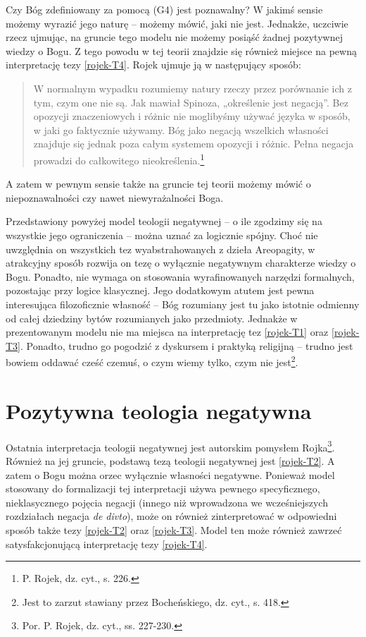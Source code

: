 Czy Bóg zdefiniowany za pomocą (G4) jest poznawalny? W jakimś sensie
możemy wyrazić jego naturę -- możemy mówić, jaki nie jest. Jednakże,
uczciwie rzecz ujmując, na gruncie tego modelu  nie możemy posiąść
żadnej pozytywnej wiedzy o Bogu. Z tego powodu w tej teorii znajdzie
się również miejsce na pewną interpretację tezy \eqref{rojek-T4}. Rojek ujmuje ją w
następujący sposób:



\begin{quote}
    W normalnym wypadku rozumiemy natury rzeczy przez porównanie ich z tym,
czym one nie są. Jak mawiał Spinoza, „określenie jest negacją”. Bez
opozycji znaczeniowych i różnic nie moglibyśmy używać języka w sposób,
w jaki go faktycznie używamy. Bóg jako negacją wszelkich własności
znajduje się jednak poza całym systemem opozycji i różnic. Pełna
negacja prowadzi do całkowitego nieokreślenia.\footnote{P. Rojek, dz.
cyt., s. 226. }
\end{quote}




A zatem w pewnym sensie także na gruncie tej teorii możemy mówić o
niepoznawalności czy nawet niewyrażalności Boga.

Przedstawiony powyżej model teologii negatywnej -- o ile zgodzimy się na
wszystkie jego ograniczenia -- można uznać za logicznie spójny. Choć nie
uwzględnia on wszystkich tez wyabstrahowanych z dzieła Areopagity, w
atrakcyjny sposób rozwija on tezę o wyłącznie negatywnym charakterze
wiedzy o Bogu. Ponadto, nie wymaga on stosowania wyrafinowanych
narzędzi formalnych, pozostając przy logice klasycznej. Jego dodatkowym
atutem jest pewna interesująca filozoficznie własność -- Bóg rozumiany
jest tu jako istotnie odmienny od całej dziedziny bytów rozumianych
jako przedmioty. Jednakże w prezentowanym modelu nie ma miejsca na
interpretację tez \eqref{rojek-T1} oraz \eqref{rojek-T3}. Ponadto, trudno go pogodzić z
dyskursem i praktyką religijną -- trudno jest bowiem oddawać cześć
czemuś, o czym wiemy tylko, czym nie jest\footnote{Jest to zarzut
stawiany przez Bocheńskiego, dz. cyt., s. 418. }.



\section{Pozytywna teologia negatywna}

Ostatnia interpretacja teologii negatywnej jest autorskim pomysłem
Rojka\footnote{Por. P. Rojek, dz. cyt., ss. 227-230. }. Również na
jej gruncie, podstawą tezą teologii negatywnej jest \eqref{rojek-T2}. A zatem o
Bogu można orzec wyłącznie własności negatywne. Ponieważ model
stosowany do formalizacji tej interpretacji używa pewnego
specyficznego, nieklasycznego pojęcia negacji (innego niż wprowadzona
we wcześniejszych rozdziałach negacja \textit{de divto}), może on
również zinterpretować w odpowiedni sposób także tezy \eqref{rojek-T2} oraz \eqref{rojek-T3}.
Model ten może również zawrzeć satysfakcjonującą interpretację tezy
\eqref{rojek-T4}.


